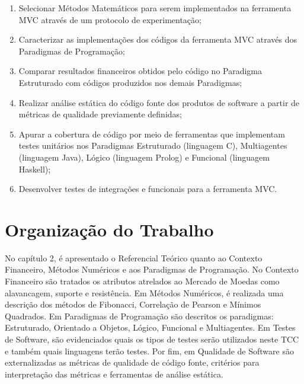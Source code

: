 \begin{enumerate}
\item Selecionar Métodos Matemáticos para serem implementados na ferramenta MVC através de um protocolo de experimentação;

\item Caracterizar as implementações dos códigos da ferramenta MVC através dos Paradigmas  de  Programação;

\item Comparar  resultados financeiros obtidos pelo código no Paradigma Estruturado com códigos produzidos nos demais Paradigmas;

\item Realizar análise estática do código fonte dos produtos de software a partir de métricas de qualidade previamente definidas;

\item Apurar a cobertura de código por meio de ferramentas que implementam testes unitários nos Paradigmas Estruturado (linguagem C), Multiagentes (linguagem Java), Lógico (linguagem Prolog) e Funcional (linguagem Haskell);

\item Desenvolver testes de integrações e funcionais para a ferramenta MVC.
\end{enumerate}

\section{Organização do Trabalho}

No capítulo 2, é apresentado o Referencial Teórico quanto ao Contexto Financeiro, Métodos Numéricos e aos Paradigmas de Programação. No Contexto Financeiro são tratados os atributos atrelados ao Mercado de Moedas como alavancagem, suporte e resistência. Em Métodos Numéricos, é realizada uma descrição dos métodos de Fibonacci, Correlação de Pearson e Mínimos Quadrados. Em Paradigmas de Programação são descritos os paradigmas: Estruturado, Orientado a Objetos, Lógico, Funcional e Multiagentes. Em Testes de Software, são evidenciados quais os tipos de testes serão utilizados neste TCC e também quais linguagens terão testes. Por fim, em Qualidade de Software são externalizadas as métricas de qualidade de  código fonte, critérios para interpretação das métricas e ferramentas de análise estática.
